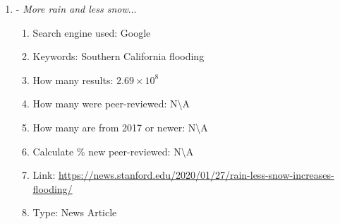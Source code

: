 \documentclass[a4paper,man,biblatex]{apa7}
\begin{document}
\begin{enumerate}
    \item \textcite{standford_2020} - \textit{More rain and less snow}...
        \begin{enumerate}
            \item Search engine used: Google
            \item Keywords: Southern California flooding 
            \item How many results: $2.69\times 10^8$ 
            \item How many were peer-reviewed: N\textbackslash A
            \item How many are from 2017 or newer:  N\textbackslash A
            \item Calculate \% new peer-reviewed: N\textbackslash A
            \item Link: \url{https://news.stanford.edu/2020/01/27/rain-less-snow-increases-flooding/}
            \item Type: News Article 
        \end{enumerate}
    
    

\end{enumerate}
\end{document}

